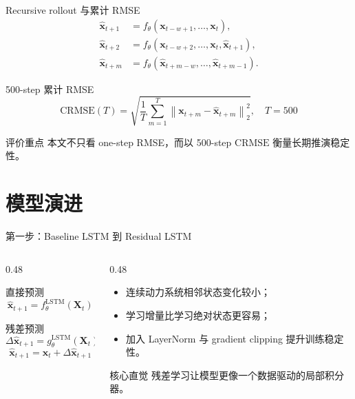 \documentclass[UTF8,aspectratio=169,11pt]{ctexbeamer}
\newcommand{\xvec}{\mathbf{x}}
\newcommand{\Xwin}{\mathbf{X}}
\newcommand{\crmse}{\mathrm{CRMSE}}
\begin{document}
\begin{frame}{Recursive rollout 与累计 RMSE}
    \begin{align*}
    \hat{\xvec}_{t+1} &= f_\theta(\xvec_{t-w+1},\dots,\xvec_t),\\
    \hat{\xvec}_{t+2} &= f_\theta(\xvec_{t-w+2},\dots,\xvec_t,\hat{\xvec}_{t+1}),\\
    \hat{\xvec}_{t+m} &= f_\theta(\hat{\xvec}_{t+m-w},\dots,\hat{\xvec}_{t+m-1}).
    \end{align*}
    \vspace{-0.3em}
    \begin{block}{500-step 累计 RMSE}
        \[
        \crmse(T)=
        \sqrt{
        \frac{1}{T}\sum_{m=1}^{T}
        \left\|\xvec_{t+m}-\hat{\xvec}_{t+m}\right\|_2^2
        },\quad T=500
        \]
    \end{block}
    \begin{alertblock}{评价重点}
        本文不只看 one-step RMSE，而以 500-step $\crmse$ 衡量长期推演稳定性。
    \end{alertblock}
\end{frame}

\section{模型演进}

\begin{frame}{第一步：Baseline LSTM 到 Residual LSTM}
    \begin{columns}[T,onlytextwidth]
        \begin{column}{0.48\textwidth}
            \begin{block}{直接预测}
                \[
                \hat{\xvec}_{t+1}=f_{\theta}^{\mathrm{LSTM}}(\Xwin_t)
                \]
            \end{block}
            \begin{block}{残差预测}
                \[
                \Delta\hat{\xvec}_{t+1}=g_{\theta}^{\mathrm{LSTM}}(\Xwin_t)
                \]
                \[
                \hat{\xvec}_{t+1}=\xvec_t+\Delta\hat{\xvec}_{t+1}
                \]
            \end{block}
        \end{column}
        \begin{column}{0.48\textwidth}
            \begin{itemize}
                \item 连续动力系统相邻状态变化较小；
                \item 学习增量比学习绝对状态更容易；
                \item 加入 LayerNorm 与 gradient clipping 提升训练稳定性。
            \end{itemize}
            \begin{alertblock}{核心直觉}
                残差学习让模型更像一个数据驱动的局部积分器。
            \end{alertblock}
        \end{column}
    \end{columns}
\end{frame}
\end{document}
